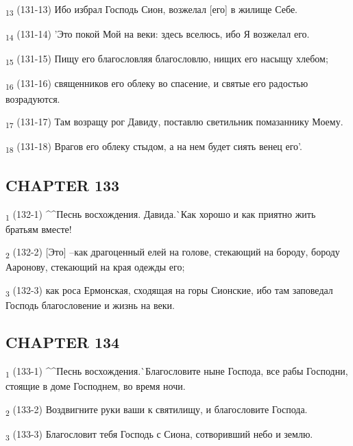 \begin{tcolorbox}
\textsubscript{13} (131-13) Ибо избрал Господь Сион, возжелал [его] в жилище Себе.
\end{tcolorbox}
\begin{tcolorbox}
\textsubscript{14} (131-14) 'Это покой Мой на веки: здесь вселюсь, ибо Я возжелал его.
\end{tcolorbox}
\begin{tcolorbox}
\textsubscript{15} (131-15) Пищу его благословляя благословлю, нищих его насыщу хлебом;
\end{tcolorbox}
\begin{tcolorbox}
\textsubscript{16} (131-16) священников его облеку во спасение, и святые его радостью возрадуются.
\end{tcolorbox}
\begin{tcolorbox}
\textsubscript{17} (131-17) Там возращу рог Давиду, поставлю светильник помазаннику Моему.
\end{tcolorbox}
\begin{tcolorbox}
\textsubscript{18} (131-18) Врагов его облеку стыдом, а на нем будет сиять венец его'.
\end{tcolorbox}
\subsection{CHAPTER 133}
\begin{tcolorbox}
\textsubscript{1} (132-1) ^^Песнь восхождения. Давида.^^ Как хорошо и как приятно жить братьям вместе!
\end{tcolorbox}
\begin{tcolorbox}
\textsubscript{2} (132-2) [Это] --как драгоценный елей на голове, стекающий на бороду, бороду Ааронову, стекающий на края одежды его;
\end{tcolorbox}
\begin{tcolorbox}
\textsubscript{3} (132-3) как роса Ермонская, сходящая на горы Сионские, ибо там заповедал Господь благословение и жизнь на веки.
\end{tcolorbox}
\subsection{CHAPTER 134}
\begin{tcolorbox}
\textsubscript{1} (133-1) ^^Песнь восхождения.^^ Благословите ныне Господа, все рабы Господни, стоящие в доме Господнем, во время ночи.
\end{tcolorbox}
\begin{tcolorbox}
\textsubscript{2} (133-2) Воздвигните руки ваши к святилищу, и благословите Господа.
\end{tcolorbox}
\begin{tcolorbox}
\textsubscript{3} (133-3) Благословит тебя Господь с Сиона, сотворивший небо и землю.
\end{tcolorbox}
